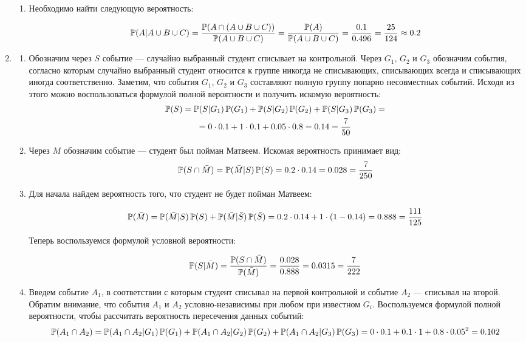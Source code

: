 \begin{enumerate}
\begin{enumerate}
	\item Необходимо найти следующую вероятность:
	
	\[
	\P(A|A\cup B\cup C)=\frac{\P(A \cap (A \cup B \cup C))}{\P(A \cup B \cup C)}=\frac{\P(A)}{\P(A \cup B \cup C)}=\frac{0.1}{0.496}=\frac{25}{124}\approx0.2
	\]
	\end{enumerate}
	
	\item
	\begin{enumerate}
		\item Обозначим через $S$ событие — случайно выбранный студент списывает на контрольной. Через $G_{1}$, $G_{2}$ и $G_{3}$ обозначим события, согласно которым случайно выбранный студент относится к группе никогда не списывающих, списывающих всегда и  списывающих иногда соответственно.
		Заметим, что события $G_{1}$, $G_{2}$ и $G_{3}$ составляют полную группу попарно несовместных событий. Исходя из этого можно воспользоваться формулой полной вероятности и получить искомую вероятность:
		\begin{multline*}
		\P(S)=\P(S|G_{1})\P(G_{1})+\P(S|G_{2})\P(G_{2})+\P(S|G_{3})\P(G_{3})=\\
		=0\cdot 0.1+1\cdot 0.1+0.05\cdot 0.8=0.14=\frac{7}{50}
		\end{multline*}
		\item Через $M$ обозначим событие — студент был пойман Матвеем. Искомая вероятность принимает вид:
		\[
		\P(S\cap\bar{M})=\P(\bar{M}|S)\P(S)=0.2\cdot 0.14=0.028=\frac{7}{250}
		\]
		
		\item
		Для начала найдем вероятность того, что студент не будет пойман Матвеем:
		
		\[
		\P(\bar{M})=\P(\bar{M}|S)\P(S)+\P(\bar{M}|\bar{S})\P(\bar{S})=0.2\cdot 0.14+1\cdot (1-0.14)=0.888=\frac{111}{125}
		\]
		
		Теперь воспользуемся формулой условной вероятности:
		
		\[
		\P(S|\bar{M})=\frac{\P(S\cap \bar{M})}{\P(\bar{M})}=\frac{0.028}{0.888}=0.0315=\frac{7}{222}
		\]
		
		\item Введем событие $A_{1}$, в соответствии с которым студент списывал на первой контрольной и событие $A_{2}$ — списывал на второй. Обратим внимание, что события $A_{1}$ и $A_{2}$ условно-независимы при любом при известном $G_i$. Воспользуемся формулой полной вероятности, чтобы рассчитать вероятность пересечения данных событий:
		\begin{multline*}
		\P(A_{1}\cap A_{2})=\P(A_{1}\cap A_{2}|G_{1})\P(G_{1})+\P(A_{1}\cap A_{2}|G_{2})\P(G_{2})+\P(A_{1}\cap A_{2}|G_{3})\P(G_{3})=0\cdot 0.1+0.1\cdot 1+0.8\cdot 0.05^2=0.102
		\end{multline*}
	\end{enumerate}
	

\end{enumerate}
